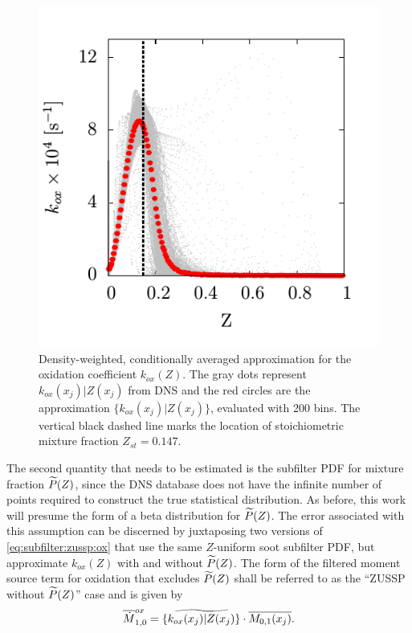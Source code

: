 \begin{figure}[htb]
  \centering
  \includegraphics[width=0.43\linewidth]{ch-subfiltermodeling/figures/koxvsz}
  \caption[Approximation for Oxidation Coefficient, \texorpdfstring{$k_{ox}(Z)$}{kox(Z)}]{Density-weighted, conditionally averaged approximation for the oxidation coefficient $k_{ox}(Z)$. The gray dots represent $k_{ox}(x_j)|Z(x_j)$ from DNS and the red circles are the approximation $\{ k_{ox}(x_j)|Z(x_j) \}$, evaluated with 200 bins. The vertical black dashed line marks the location of stoichiometric mixture fraction $Z_{st} = 0.147$.}
  \label{fig:subfilter:dns:kox}
\end{figure}

The second quantity that needs to be estimated is the subfilter PDF for mixture fraction $\pz$, since the DNS database does not have the infinite number of points required to construct the true statistical distribution. As before, this work will presume the form of a beta distribution for $\pz$. The error associated with this assumption can be discerned by juxtaposing two versions of \cref{eq:subfilter:zussp:ox} that use the same $Z$-uniform soot subfilter PDF, but approximate $k_{ox}(Z)$ with and without $\pz$. The form of the filtered moment source term for oxidation that excludes $\pz$ shall be referred to as the ``ZUSSP without $\pz$'' case and is given by
\begin{equation}\label{eq:subfilter:dns:mzusspwithoutpz}
  \fst[M]{1,0}^{ox} = \{ \tf{k_{ox}(x_j)|Z(x_j)} \} \cdot \mean{M_{0,1}(x_j)}.
\end{equation}

